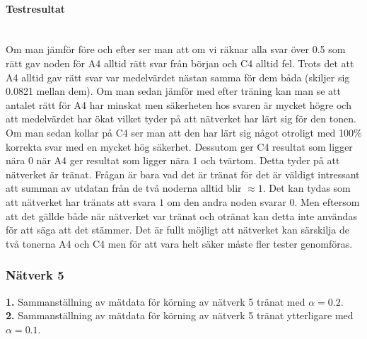 \documentclass[a4paper,10pt]{article}
\begin{document}
\paragraph{Testresultat}\hspace{0pt}\\
Om man jämför före och efter ser man att om vi räknar alla svar över 0.5 som rätt gav noden för A4 alltid rätt svar från början och C4 alltid fel. Trots det att A4 alltid gav rätt svar var medelvärdet nästan samma för dem båda (skiljer sig 0.0821 mellan dem). Om man sedan jämför med efter träning kan man se att antalet rätt för A4 har minskat men säkerheten hos svaren är mycket högre och att medelvärdet har ökat vilket tyder på att nätverket har lärt sig för den tonen. Om man sedan kollar på C4 ser man att den har lärt sig något otroligt med 100\% korrekta svar med en mycket hög säkerhet. Dessutom ger C4 resultat som ligger nära $0$ när A4 ger resultat som ligger nära $1$ och tvärtom. Detta tyder på att nätverket är tränat. Frågan är bara vad det är tränat för det är väldigt intressant att summan av utdatan från de två noderna alltid blir $\approx 1$. Det kan tydas som att nätverket har tränats att svara $1$ om den andra noden svarar $0$. Men eftersom att det gällde både när nätverket var tränat och otränat kan detta inte användas för att säga att det stämmer. Det är fullt möjligt att nätverket kan särskilja de två tonerna A4 och C4 men för att vara helt säker måste fler tester genomföras.
\subsubsection{Nätverk 5}
{\bf1.} Sammanställning av mätdata för körning av nätverk 5 tränat med $\alpha=0.2$.\\
{\bf2.} Sammanställning av mätdata för körning av nätverk 5 tränat ytterligare med $\alpha=0.1$.\\
\begin{center}
\end{center}
\end{document}
